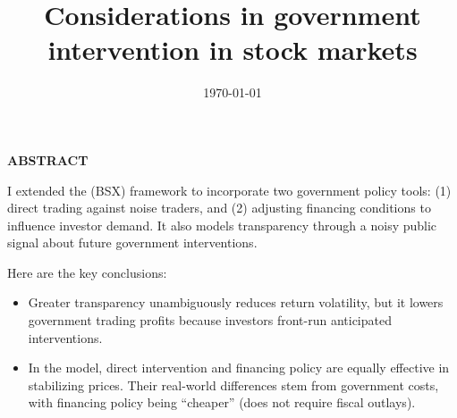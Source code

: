 \documentclass[12pt]{article}
\begin{document}
\onehalfspacing      %
\renewcommand{\thempfootnote}{\fnsymbol{mpfootnote}}


\vspace{1.5cm}
 \author{
 }

\title{\vspace*{0.0in}\Large \bf 
Considerations in government intervention in stock markets
}


\date{\today}              %


\maketitle


\thispagestyle{empty}
\onehalfspacing
\centerline{\bf ABSTRACT}

\noindent I extended the \citet{brunnermeier2022china} (BSX) framework to incorporate two government policy tools: (1) direct trading against noise traders, and (2) adjusting financing conditions to influence investor demand. It also models transparency through a noisy public signal about future government interventions.



Here are the key conclusions:
\begin{itemize}
    \item Greater transparency unambiguously reduces return volatility, but it lowers government trading profits because investors front-run anticipated interventions.

    \item In the model, direct intervention and financing policy are equally effective in stabilizing prices. Their real-world differences stem from government costs, with financing policy being ``cheaper'' (does not require fiscal outlays). 
\end{itemize}

\medskip

\vspace{0.1cm}

\end{document}
